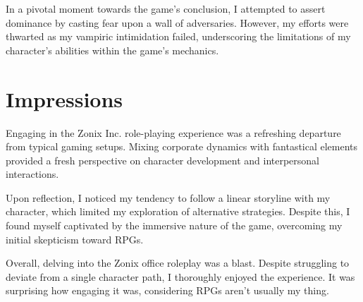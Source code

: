 In a pivotal moment towards the game's conclusion, I attempted to assert dominance by casting fear upon a wall of adversaries. However, my efforts were thwarted as my vampiric intimidation failed, underscoring the limitations of my character's abilities within the game's mechanics.\\

\section*{Impressions}
Engaging in the Zonix Inc. role-playing experience was a refreshing departure from typical gaming setups. Mixing corporate dynamics with fantastical elements provided a fresh perspective on character development and interpersonal interactions.

Upon reflection, I noticed my tendency to follow a linear storyline with my character, which limited my exploration of alternative strategies. Despite this, I found myself captivated by the immersive nature of the game, overcoming my initial skepticism toward RPGs.

Overall, delving into the Zonix office roleplay was a blast. Despite struggling to deviate from a single character path, I thoroughly enjoyed the experience. It was surprising how engaging it was, considering RPGs aren't usually my thing.
